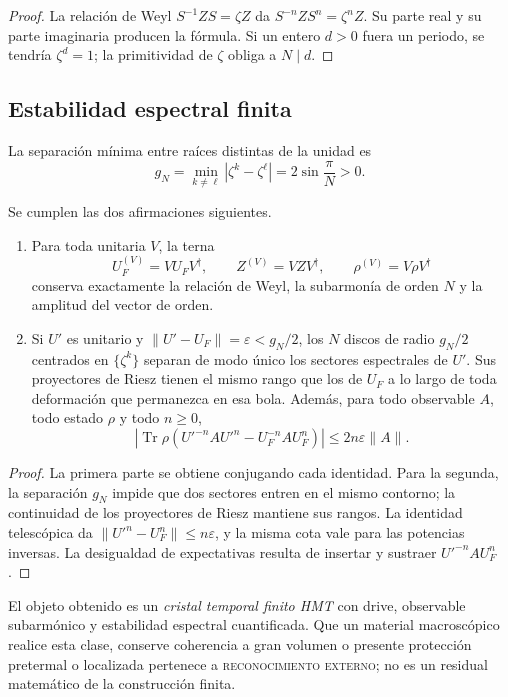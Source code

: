 \begin{proof}
La relación de Weyl \(S^{-1} Z S=\zeta Z\) da
\(S^{-n} Z S^n=\zeta^n Z\). Su parte real y su parte imaginaria producen la
fórmula. Si un entero \(d>0\) fuera un periodo, se tendría
\(\zeta^d=1\); la primitividad de \(\zeta\) obliga a \(N\mid d\).
\end{proof}

\subsection{Estabilidad espectral finita}

La separación mínima entre raíces distintas de la unidad es
\[
 g_N=\min_{k\ne\ell}|\zeta^k-\zeta^\ell|
 =2\sin\frac{\pi}{N}>0.
\]

\begin{theorem}
\label{v:thm:hmtf2-estabilidad-cristal}
Se cumplen las dos afirmaciones siguientes.

\begin{enumerate}
 \item Para toda unitaria \(V\), la terna
 \[
  U_F^{(V)}=V U_F V^\dagger,\qquad
  Z^{(V)}=V Z V^\dagger,\qquad
  \rho^{(V)}=V\rho V^\dagger
 \]
 conserva exactamente la relación de Weyl, la subarmonía de orden \(N\) y
 la amplitud del vector de orden.
 \item Si \(U'\) es unitario y
 \(\|U'-U_F\|=\varepsilon<g_N/2\), los \(N\) discos de radio
 \(g_N/2\) centrados en \(\{\zeta^k\}\) separan de modo único los sectores
 espectrales de \(U'\). Sus proyectores de Riesz tienen el mismo rango que
 los de \(U_F\) a lo largo de toda deformación que permanezca en esa bola.
 Además, para todo observable \(A\), todo estado \(\rho\) y todo \(n\geq0\),
 \[
 \left|
 \operatorname{Tr}\rho\left(U'^{-n}AU'^n-U_F^{-n}AU_F^n\right)
 \right|
 \leq 2n\varepsilon\|A\|.
 \]
\end{enumerate}
\end{theorem}

\begin{proof}
La primera parte se obtiene conjugando cada identidad. Para la segunda, la
separación \(g_N\) impide que dos sectores entren en el mismo contorno; la
continuidad de los proyectores de Riesz mantiene sus rangos. La identidad
telescópica da
\(\|U'^n-U_F^n\|\leq n\varepsilon\), y la misma cota vale para las
potencias inversas. La desigualdad de expectativas resulta de insertar y
sustraer \(U'^{-n}AU_F^n\).
\end{proof}

El objeto obtenido es un \emph{cristal temporal finito HMT} con drive,
observable subarmónico y estabilidad espectral cuantificada. Que un material
macroscópico realice esta clase, conserve coherencia a gran volumen o
presente protección pretermal o localizada pertenece a
\textsc{reconocimiento externo}; no es un residual matemático de la
construcción finita.


